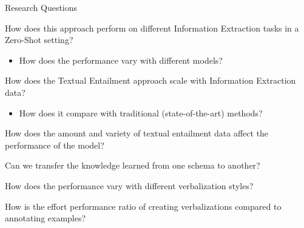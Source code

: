 \documentclass[
    11pt,
    notheorems,
    xcolor={dvipsnames},
    hyperref={
        pdfstartview=FitH, 
        pdftitle={Ikasketa-adibide urriko Informazio-Erauzketa}, 
        pdfauthor={Oscar Sainz Jimenez}, 
        citecolor=secondary, 
    }
]{beamer}
\begin{document}





\begin{frame}
    \begin{block}{Research Questions}
        \begin{itemize}
            {
                \item How does this approach perform on different Information Extraction tasks in a Zero-Shot setting?
                \begin{itemize}
                    \item How does the performance vary with different models?
                \end{itemize}
            }
            {
                \item How does the Textual Entailment approach scale with Information Extraction data?
                \begin{itemize}
                    \item How does it compare with traditional (state-of-the-art) methods?
                \end{itemize} 
            }
            {
                \item How does the amount and variety of textual entailment data affect the performance of the model?
            }
            {
                \item Can we transfer the knowledge learned from one schema to another?
            }
            {
                \item How does the performance vary with different verbalization styles?
            }
            {
                \item How is the effort performance ratio of creating verbalizations compared to annotating examples?
            }
        \end{itemize}
    \end{block}
\end{frame}
\end{document}
